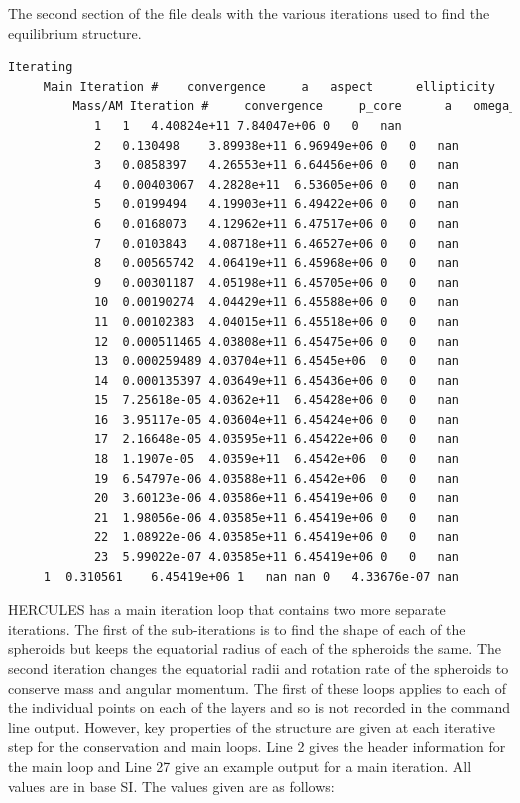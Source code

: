 \documentclass[11pt, oneside]{article}   	%
\begin{document}
\setlength{\leftskip}{0pt}
\setlength{\parskip}{0 pt}
\setlength{\parindent}{15pt}
 
The second section of the file deals with the various iterations used to find the equilibrium structure. 
\begin{lstlisting}[language=TeX]
Iterating
	 Main Iteration # 	 convergence 	 a 	 aspect 	 ellipticity 	 l 	 omega_rot 	 Mass error 	 AM error 
		 Mass/AM Iteration # 	 convergence 	 p_core 	 a 	 omega_rot 	 edge corot 	 AM error 
	 	 	1	1	4.40824e+11	7.84047e+06	0	0	nan
	 	 	2	0.130498	3.89938e+11	6.96949e+06	0	0	nan
	 	 	3	0.0858397	4.26553e+11	6.64456e+06	0	0	nan
	 	 	4	0.00403067	4.2828e+11	6.53605e+06	0	0	nan
	 	 	5	0.0199494	4.19903e+11	6.49422e+06	0	0	nan
	 	 	6	0.0168073	4.12962e+11	6.47517e+06	0	0	nan
	 	 	7	0.0103843	4.08718e+11	6.46527e+06	0	0	nan
	 	 	8	0.00565742	4.06419e+11	6.45968e+06	0	0	nan
	 	 	9	0.00301187	4.05198e+11	6.45705e+06	0	0	nan
	 	 	10	0.00190274	4.04429e+11	6.45588e+06	0	0	nan
	 	 	11	0.00102383	4.04015e+11	6.45518e+06	0	0	nan
	 	 	12	0.000511465	4.03808e+11	6.45475e+06	0	0	nan
	 	 	13	0.000259489	4.03704e+11	6.4545e+06	0	0	nan
	 	 	14	0.000135397	4.03649e+11	6.45436e+06	0	0	nan
	 	 	15	7.25618e-05	4.0362e+11	6.45428e+06	0	0	nan
	 	 	16	3.95117e-05	4.03604e+11	6.45424e+06	0	0	nan
	 	 	17	2.16648e-05	4.03595e+11	6.45422e+06	0	0	nan
	 	 	18	1.1907e-05	4.0359e+11	6.4542e+06	0	0	nan
	 	 	19	6.54797e-06	4.03588e+11	6.4542e+06	0	0	nan
	 	 	20	3.60123e-06	4.03586e+11	6.45419e+06	0	0	nan
	 	 	21	1.98056e-06	4.03585e+11	6.45419e+06	0	0	nan
	 	 	22	1.08922e-06	4.03585e+11	6.45419e+06	0	0	nan
	 	 	23	5.99022e-07	4.03585e+11	6.45419e+06	0	0	nan
	 1	0.310561	6.45419e+06	1	nan	nan	0	4.33676e-07	nan
\end{lstlisting}

HERCULES has a main iteration loop that contains two more separate iterations. The first of the sub-iterations is to find the shape of each of the spheroids but keeps the equatorial radius of each of the spheroids the same. The second iteration changes the equatorial radii and rotation rate of the spheroids to conserve mass and angular momentum. The first of these loops applies to each of the individual points on each of the layers and so is not recorded in the command line output. However, key properties of the structure are given at each iterative step for the conservation and main loops. Line 2 gives the header information for the main loop and Line 27 give an example output for a main iteration. All values are in base SI. The values given are as follows: \\
\end{document}
